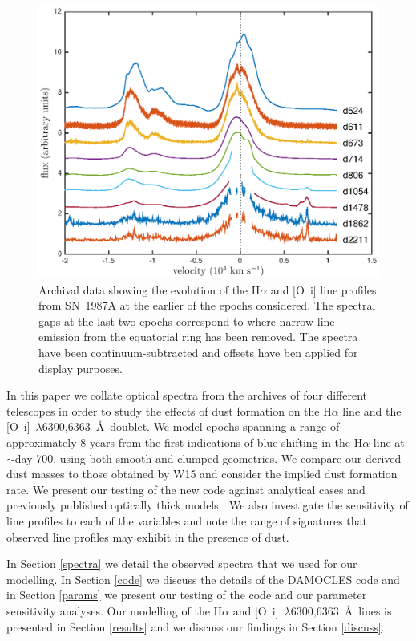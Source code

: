 \documentclass[useAMS,usenatbib,usegraphicx]{mnras}
\begin{document}
\begin{figure}
\includegraphics[trim =39 10 45 15,clip=true,scale=0.51]{Ha_evol_early_1col2}
\caption{Archival data showing the evolution of the H$\alpha$ and
[O~{\sc i}] line profiles from SN~1987A at the earlier of the epochs considered. The 
spectral gaps at the last two epochs correspond to where narrow line 
emission from the equatorial ring has been removed. The spectra have been
continuum-subtracted and offsets have ben applied for display purposes.}
\label{Ha_evol_early}
\end{figure}

In this paper we collate optical spectra from the archives of four 
different telescopes in order to study the effects of dust formation on 
the H$\alpha$ line and the [O~{\sc i}]~$\lambda$6300,6363~\AA\ doublet.  
We model epochs spanning a range of approximately 8 years 
from the first indications of blue-shifting in the H$\alpha$ line at 
$\sim$day 700, using both smooth and clumped geometries.  We compare our 
derived dust masses to those obtained by W15 and consider the implied dust
formation rate.  We present our testing of the new code against 
analytical cases and previously published optically thick models \citep{Lucy1989}. 
We also investigate 
the sensitivity of line profiles to each of the variables and 
 note the range of signatures that observed line profiles may exhibit 
in the presence of dust.

In Section \ref{spectra} we detail the observed spectra that we used for our 
modelling.  In Section \ref{code} we discuss the details of the DAMOCLES 
code and in Section \ref{params} we present our testing of the code and our parameter sensitivity 
analyses.  Our modelling of the H$\alpha$ and 
[O~{\sc i}]~$\lambda$6300,6363~\AA\ lines is presented in Section 
\ref{results} and  we discuss our findings in Section \ref{discuss}.
\end{document}
